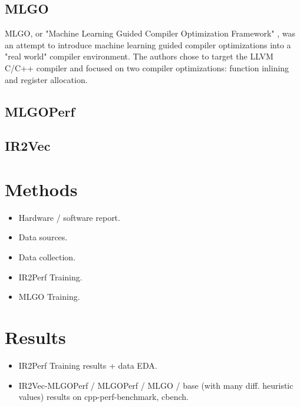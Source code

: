 \documentclass[nohyperref]{article}
\theoremstyle{plain}
\theoremstyle{definition}
\theoremstyle{remark}
\begin{document}
\subsection{MLGO}
MLGO, or "Machine Learning Guided Compiler Optimization Framework" \cite{mlgo}, was an attempt to introduce machine learning guided compiler optimizations into a "real world" compiler environment. The authors chose to target the LLVM C/C++ compiler and focused on two compiler optimizations: function inlining and register allocation.



\subsection{MLGOPerf}

\subsection{IR2Vec}

\section{Methods}
\label{methods}
\begin{itemize}
\item Hardware / software report\@.
\item Data sources\@.
\item Data collection\@.
\item IR2Perf Training\@.
\item MLGO Training\@.
\end{itemize}

\section{Results}
\label{results}
\begin{itemize}
\item IR2Perf Training results + data EDA\@.
\item IR2Vec-MLGOPerf / MLGOPerf / MLGO / base (with many diff. heuristic values) results on cpp-perf-benchmark, cbench\@.
\end{itemize}
\end{document}
